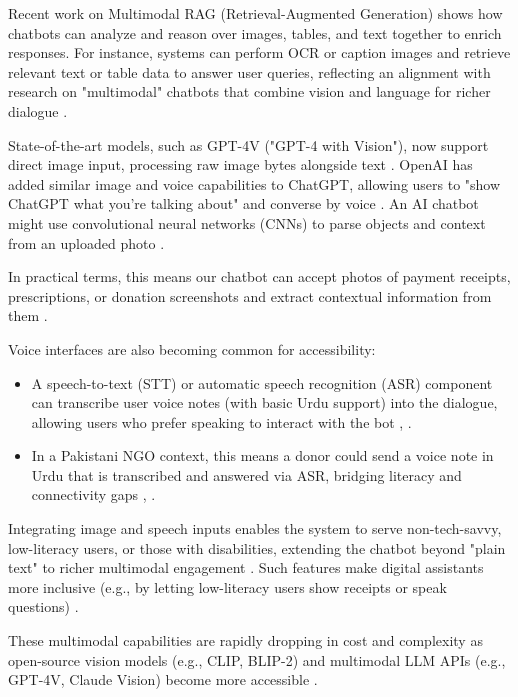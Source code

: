 Recent work on Multimodal RAG (Retrieval-Augmented Generation) shows how chatbots can analyze and reason over images, tables, and text together to enrich responses. For instance, systems can perform OCR or caption images and retrieve relevant text or table data to answer user queries, reflecting an alignment with research on "multimodal" chatbots that combine vision and language for richer dialogue \cite{gulab2024multimodalrag}.

State-of-the-art models, such as GPT-4V ("GPT-4 with Vision"), now support direct image input, processing raw image bytes alongside text \cite{gulab2024multimodalrag}. OpenAI has added similar image and voice capabilities to ChatGPT, allowing users to "show ChatGPT what you’re talking about" and converse by voice \cite{openai2023multimodal}. An AI chatbot might use convolutional neural networks (CNNs) to parse objects and context from an uploaded photo \cite{ijaresm2024multimodal}.

In practical terms, this means our chatbot can accept photos of payment receipts, prescriptions, or donation screenshots and extract contextual information from them \cite{gulab2024multimodalrag}.

Voice interfaces are also becoming common for accessibility:
\begin{itemize}\setlength{\itemsep}{0pt}
    \item A speech-to-text (STT) or automatic speech recognition (ASR) component can transcribe user voice notes (with basic Urdu support) into the dialogue, allowing users who prefer speaking to interact with the bot  \cite{gulab2024multimodalrag}, \cite{ijaresm2024multimodal}.
    \item In a Pakistani NGO context, this means a donor could send a voice note in Urdu that is transcribed and answered via ASR, bridging literacy and connectivity gaps \cite{ijaresm2024multimodal}, \cite{openai2023multimodal}.
\end{itemize}

Integrating image and speech inputs enables the system to serve non-tech-savvy, low-literacy users, or those with disabilities, extending the chatbot beyond "plain text" to richer multimodal engagement \cite{gulab2024multimodalrag}. Such features make digital assistants more inclusive (e.g., by letting low-literacy users show receipts or speak questions) \cite{openai2023multimodal}.

These multimodal capabilities are rapidly dropping in cost and complexity as open-source vision models (e.g., CLIP, BLIP-2) and multimodal LLM APIs (e.g., GPT-4V, Claude Vision) become more accessible \cite{gulab2024multimodalrag}.

